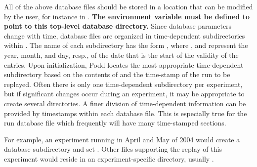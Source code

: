 {{All of the above database files should be stored in a location
that can be modified by the user, for instance in .
{\bf The environment variable 
must be defined to point to this top-level database
directory.} Since database parameters change with time, database files
are organized in time-dependent subdirectories within .
The name of each subdirectory has the form , where 
,  and  
represent the year, month, and day, resp., of the 
date that is the start of the validity of the entries. Upon initialization,
Podd locates the most appropriate time-dependent subdirectory based on
the contents of  
and the time-stamp of the run to be replayed.
Often there is only one time-dependent subdirectory per experiment, but
if significant changes occur during an experiment, it may be appropriate to
create several directories.
A finer division of time-dependent information
can be provided by timestamps within each database file. This
is especially true for the run database file which frequently
will have many time-stamped sections.

For example, an experiment running in April and May of 2004 would
create a database subdirectory  and set
. Other files supporting the replay
of this experiment would reside in an experiment-specific
directory, usually .


} %

}
